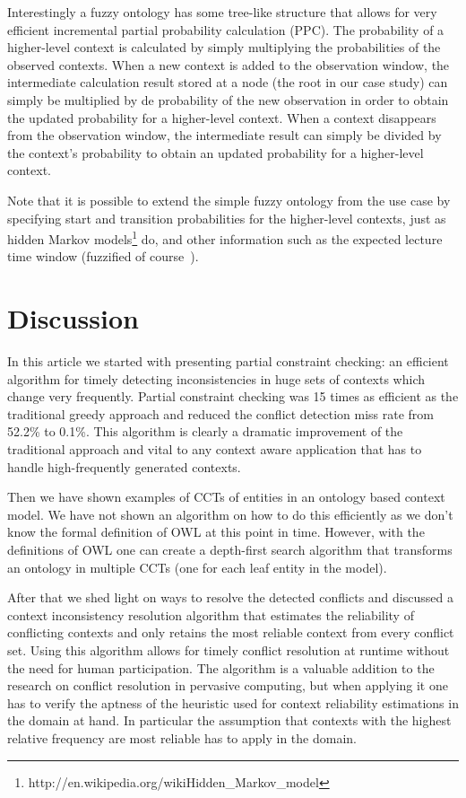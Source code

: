 \documentclass[journal]{vgtc}                %
\begin{document}
Interestingly a fuzzy ontology has some tree-like structure that allows for very efficient incremental partial probability calculation (PPC). The probability of a higher-level context is calculated by simply multiplying the probabilities of the observed contexts. When a new context is added to the observation window, the intermediate calculation result stored at a node (the root in our case study) can simply be multiplied by de probability of the new observation in order to obtain the updated probability for a higher-level context. When a context disappears from the observation window, the intermediate result can simply be divided by the context's probability to obtain an updated probability for a higher-level context. 

Note that it is possible to extend the simple fuzzy ontology from the use case by specifying start and transition probabilities for the higher-level contexts, just as hidden Markov models\footnote{http://en.wikipedia.org/wikiHidden\_Markov\_model} do, and other information such as the expected lecture time window (fuzzified of course~\cite{Buckley1995245}).

\section{Discussion}
In this article we started with presenting partial constraint checking: an efficient algorithm for timely detecting inconsistencies in huge sets of contexts which change very frequently. Partial constraint checking was 15 times as efficient as the traditional greedy approach and reduced the conflict detection miss rate from 52.2\% to 0.1\%. This algorithm is clearly a dramatic improvement of the traditional approach and vital to any context aware application that has to handle high-frequently generated contexts.

Then we have shown examples of CCTs of entities in an ontology based context model. We have not shown an algorithm on how to do this efficiently as we don't know the formal definition of OWL at this point in time. However, with the definitions of OWL one can create a depth-first search algorithm that transforms an ontology in multiple CCTs (one for each leaf entity in the model).

After that we shed light on ways to resolve the detected conflicts and discussed a context inconsistency resolution algorithm that estimates the reliability of conflicting contexts and only retains the most reliable context from every conflict set. Using this algorithm allows for timely conflict resolution at runtime without the need for human participation. The algorithm is a valuable addition to the research on conflict resolution in pervasive computing, but when applying it one has to verify the aptness of the heuristic used for context reliability estimations in the domain at hand. In particular the assumption that contexts with the highest relative frequency are most reliable has to apply in the domain.
\end{document}
